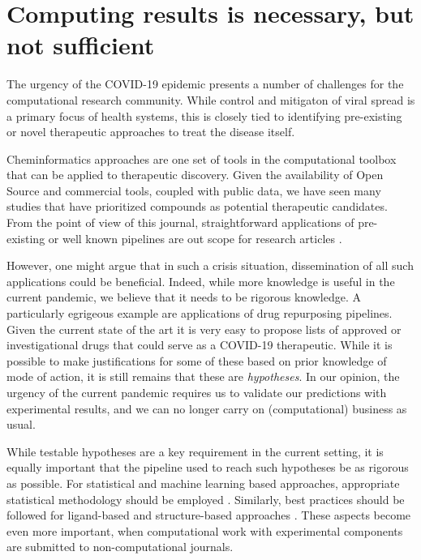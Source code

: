 \documentclass{bmcart}
\begin{document}
\section*{Computing results is necessary, but not sufficient}

The urgency of the COVID-19 epidemic presents a number of challenges
for the computational research community. While control and mitigaton
of viral spread is a primary focus of health systems, this is closely
tied to identifying pre-existing or novel therapeutic approaches to
treat the disease itself.

Cheminformatics approaches are one set of tools in the computational
toolbox that can be applied to therapeutic discovery. Given the
availability of Open Source and commercial tools, coupled with public
data, we have seen many studies that have prioritized compounds as
potential therapeutic candidates. From the point of view of this
journal, straightforward applications of pre-existing or well known
pipelines are out scope for research articles \cite{jcheminf_scope}.

However, one might argue that in such a crisis situation,
dissemination of all such applications could be beneficial. Indeed,
while more knowledge is useful in the current pandemic, we believe
that it needs to be rigorous knowledge. A particularly egrigeous
example are applications of drug repurposing pipelines. Given the
current state of the art it is very easy to propose lists of approved
or investigational drugs that could serve as a COVID-19
therapeutic. While it is possible to make justifications for some of
these based on prior knowledge of mode of action, it is still remains
that these are \emph{hypotheses}. In our opinion, the urgency of the
current pandemic requires us to validate our predictions with
experimental results, and we can no longer carry on (computational)
business as usual.

While testable hypotheses are a key requirement in the current
setting, it is equally important that the pipeline used to reach such
hypotheses be as rigorous as possible. For statistical and machine
learning based approaches, appropriate statistical methodology should
be employed \cite{cc_stats_1,cc_stats_2, cc_stats_3}. Similarly, best
practices should be followed for ligand-based \cite{qsar_1, qsar_2}
and structure-based approaches \cite{sbdd_1, sbdd_2}. These aspects
become even more important, when computational work with experimental
components are submitted to non-computational journals.
\end{document}
